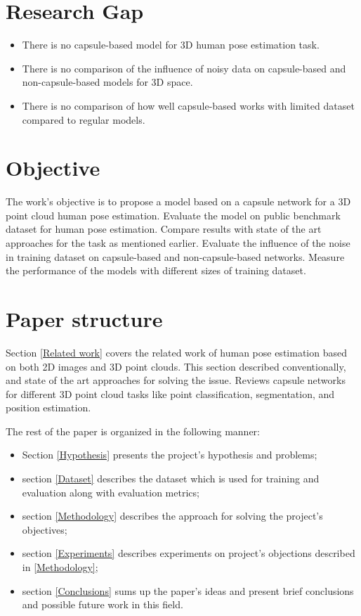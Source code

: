 \section{Research Gap}
\begin{itemize}
  \item There is no capsule-based model for 3D human pose estimation task.
  \item There is no comparison of the influence of noisy data on capsule-based and non-capsule-based models for 3D space.
  \item There is no comparison of how well capsule-based works with limited dataset compared to regular models.
\end{itemize}

\section{Objective}
The work's objective is to propose a model based on a capsule network for a 3D point cloud human pose estimation. Evaluate the model on public benchmark dataset for human pose estimation. Compare results with state of the art approaches for the task as mentioned earlier. Evaluate the influence of the noise in training dataset on capsule-based and non-capsule-based networks. Measure the performance of the models with different sizes of training dataset.

\section{Paper structure}
Section \ref{Related work} covers the related work of human pose estimation based on both 2D images and 3D point clouds. This section described conventionally, and state of the art approaches for solving the issue. Reviews capsule networks for different 3D point cloud tasks like point classification, segmentation, and position estimation.

The rest of the paper is organized in the following manner:
\begin{itemize}
  \item Section \ref{Hypothesis} presents the project's hypothesis and problems;
    \item  section \ref{Dataset} describes the dataset which is used for training and evaluation along with evaluation metrics;
  \item  section \ref{Methodology} describes the approach for solving the project's objectives;
   \item  section \ref{Experiments} describes experiments on project's objections described in \ref{Methodology};
  \item  section \ref{Conclusions} sums up the paper's ideas and present brief conclusions and possible future work in this field.
\end{itemize}